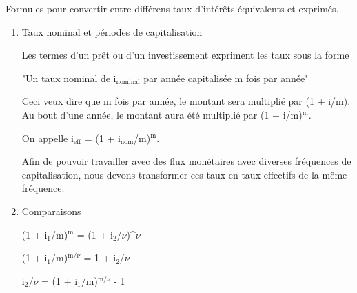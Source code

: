 \documentclass[11pt]{article}
\begin{document}
Formules pour convertir entre différens taux d'intérêts équivalents et exprimés.

\begin{enumerate}
\item Taux nominal et périodes de capitalisation
\label{sec:org42b20bd}

Les termes d'un prêt ou d'un investissement expriment les taux sous la forme

"Un taux nominal de i\(_{\text{nominal}}\) par année capitalisée m fois par année"

Ceci veux dire que m fois par année, le montant sera multiplié par (1 + i/m).
Au bout d'une année, le montant aura été multiplié par (1 + i/m)\(^{\text{m}}\).

On appelle i\(_{\text{eff}}\) = (1 + i\(_{\text{nom}}\)/m)\(^{\text{m}}\).

Afin de pouvoir travailler avec des flux monétaires avec diverses fréquences de
capitalisation, nous devons transformer ces taux en taux effectifs de la même fréquence.

\item Comparaisons
\label{sec:org9c7e8fa}

(1 + i\(_{\text{1}}\)/m)\(^{\text{m}}\) = (1 + i\(_{\text{2}}\)/\(\nu\))\^{}\(\nu\)

(1 + i\(_{\text{1}}\)/m)\(^{\text{m/}\nu}\) = 1 + i\(_{\text{2}}\)/\(\nu\)

i\(_{\text{2}}\)/\(\nu\) = (1 + i\(_{\text{1}}\)/m)\(^{\text{m/}\nu}\) - 1
\end{enumerate}
\end{document}
